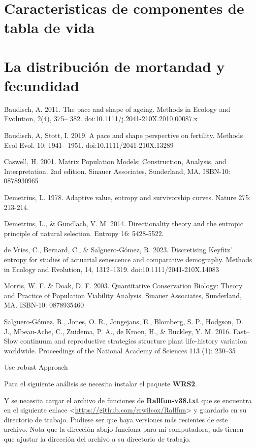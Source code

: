 \documentclass[
  12pt,
  letterpaper,
]{book}
\begin{document}
\section{Caracteristicas de componentes de tabla de
vida}\label{caracteristicas-de-componentes-de-tabla-de-vida}

\section{La distribución de mortandad y
fecundidad}\label{la-distribuciuxf3n-de-mortandad-y-fecundidad}

Baudisch, A. 2011. The pace and shape of ageing. Methods in Ecology and
Evolution, 2(4), 375-- 382. doi:10.1111/j.2041-210X.2010.00087.x

Baudisch, A, Stott, I. 2019. A pace and shape perspective on fertility.
Methods Ecol Evol. 10: 1941-- 1951. doi:10.1111/2041-210X.13289

Caswell, H. 2001. Matrix Population Models: Construction, Analysis, and
Interpretation. 2nd edition. Sinauer Associates, Sunderland, MA.
ISBN-10: 0878930965

Demetrius, L. 1978. Adaptive value, entropy and survivorship curves.
Nature 275: 213-214.

Demetrius, L., \& Gundlach, V. M. 2014. Directionality theory and the
entropic principle of natural selection. Entropy 16: 5428-5522.

de Vries, C., Bernard, C., \& Salguero-Gómez, R. 2023. Discretising
Keyfitz' entropy for studies of actuarial senescence and comparative
demography. Methods in Ecology and Evolution, 14, 1312--1319.
doi:10.1111/2041-210X.14083

Morris, W. F. \& Doak, D. F. 2003. Quantitative Conservation Biology:
Theory and Practice of Population Viability Analysis. Sinauer
Associates, Sunderland, MA. ISBN-10: 0878935460

Salguero-Gómez, R., Jones, O. R., Jongejans, E., Blomberg, S. P.,
Hodgson, D. J., Mbeau-Ache, C., Zuidema, P. A., de Kroon, H., \&
Buckley, Y. M. 2016. Fast--Slow continuum and reproductive strategies
structure plant life-history variation worldwide. Proceedings of the
National Academy of Sciences 113 (1): 230--35

Use robust Approach

Para el siguiente análisis se necesita instalar el paquete
\textbf{WRS2}.

Y se necesita cargar el archivo de funciones de \textbf{Rallfun-v38.txt}
que se encuentra en el siguiente enlace
\textless{}\url{https://github.com/rrwilcox/Rallfun}\textgreater{} y
guardarlo en su directorio de trabajo. Pudiese ser que haya versiones
más recientes de este archivo. Nota que la dirección abajo funciona para
mi computadora, uds tienen que ajustar la dirección del archivo a su
directorio de trabajo.
\end{document}
